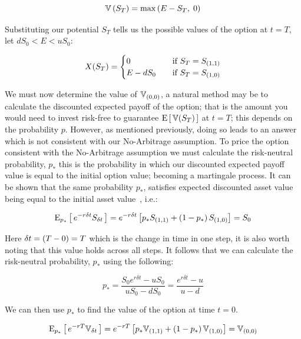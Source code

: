 \begin{equation*}
    \mathbb{V}\left(S_T\right) = \max\left(E-S_T,\;0\right)
\end{equation*}

Substituting our potential \(S_T\) tells us the possible values of the option at \(t=T\), let \(dS_0 < E < uS_0\):

\begin{align*}
    X(S_T) 
    =
    \begin{cases}
        0 &\quad \text{if }S_T=S_{\left(1,1\right)} \\
        E-dS_0 &\quad \text{if }S_T=S_{\left(1,0\right)}
    \end{cases}
\end{align*}

We must now determine the value of \(\mathbb{V}_{\left(0,0\right)}\), a natural method may be to calculate the discounted expected payoff of the option; that is the amount you would need to invest risk-free to guarantee \(\text{E}\left[\,\mathbb{V}(S_T)\,\right]\) at \(t=T\); this depends on the probability \(p\). However, as mentioned previously, doing so leads to an answer which is not consistent with our No-Arbitrage assumption. To price the option consistent with the No-Arbitrage assumption we must calculate the risk-neutral probability, \(p_*\) this is the probability in which our discounted expected payoff value is equal to the initial option value; becoming a martingale process. It can be shown that the same probability \(p_*\), satisfies expected discounted asset value being equal to the initial asset value~\cite{kritzman2000puzzles}, i.e.:

\begin{equation*}
    \text{E}_{p_*}\left[\,e^{-r\delta t}S_{\delta t}\,\right] = e^{-r\delta t}\left[p_*S_{\left(1,1\right)} + \left(1-p_*\right)S_{\left(1,0\right)}\right] = S_0
\end{equation*}

Here \(\delta t = \left(T-0\right) = T\) which is the change in time in one step, it is also worth noting that this value holds across all steps. It follows that we can calculate the risk-neutral probability, \(p_*\) using the following:

\begin{equation}\label{eqn: Risk Neutral Prob}
    p_* = \frac{S_0e^{r\delta t} - uS_0}{uS_0 - dS_0} = \frac{e^{r\delta t} - u}{u - d}
\end{equation}

We can then use \(p_*\) to find the value of the option at time \(t = 0\).

\begin{equation*}
     \text{E}_{p_*}\left[\,e^{-rT}\mathbb{V}_{\delta t}\,\right] = e^{-rT}\left[p_*\mathbb{V}_{\left(1,1\right)} + \left(1-p_*\right)\mathbb{V}_{\left(1,0\right)}\right] = \mathbb{V}_{\left(0,0\right)}
\end{equation*}


